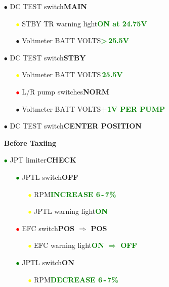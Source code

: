 \documentclass[a4paper,12pt,dvipsnames]{letter}
\newcommand{\button}[1]{\textbf{#1}}
\newcommand{\ok}[1]{\textcolor{Green}{\textbf{#1}}}
\newcommand{\bi}{\textcolor{ProcessBlue}{$\bullet$\;}}
\newcommand{\ri}{\textcolor{red}{$\bullet$\;}}
\newcommand{\gi}{\textcolor{Green}{$\bullet$\;}}
\newcommand{\yi}{\textcolor{Yellow}{$\bullet$\;}}
\begin{document}
{\begin{itemize}
\begin{itemize}
\begin{itemize}
  \item[\bi] Voltmeter BATT VOLTS\dotfill\ok{27\;V STABLE}
 \end{itemize}
 \item[\bi] DC TEST switch\dotfill\button{MAIN}
 \begin{itemize}
  \item[\yi] STBY TR warning light\dotfill\ok{ON at 24.75\;V}
  \item[\bi] Voltmeter BATT VOLTS\dotfill\ok{>\,25.5\;V}
 \end{itemize}
 \item[\bi] DC TEST switch\dotfill\button{STBY}
 \begin{itemize}
  \item[\yi] Voltmeter BATT VOLTS\dotfill\ok{\texttildelow\,25.5\;V}
  \item[\ri] L/R pump switches\dotfill\button{NORM}
  \item[\bi] Voltmeter BATT VOLTS\dotfill\ok{+1\;V PER PUMP}
 \end{itemize}
 \item[\bi] DC TEST switch\dotfill\button{CENTER POSITION}
\end{itemize}
\end{itemize}
\newpage
\begin{itemize}
\item[] {\LARGE\textbf{Before Taxiing}}
\item[\gi] JPT limiter\dotfill\button{CHECK}
\begin{itemize}
 \item[\gi] JPTL switch\dotfill\button{OFF}
 \begin{itemize}
  \item[\yi] RPM\dotfill\ok{INCREASE 6\,-\,7\%}
  \item[\yi] JPTL warning light\dotfill\ok{ON}
 \end{itemize}
 \item[\ri] EFC switch\dotfill\button{POS $\Rightarrow$ POS}
 \begin{itemize}
  \item[\yi] EFC warning light\dotfill\ok{ON $\Rightarrow$ OFF}
 \end{itemize}
 \item[\gi] JPTL switch\dotfill\button{ON}
 \begin{itemize}
  \item[\yi] RPM\dotfill\ok{DECREASE 6\,-\,7\%}

\end{itemize}
\end{itemize}
\end{itemize}}
\end{document}
